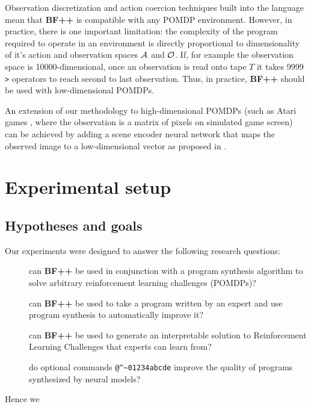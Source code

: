 Observation discretization and action coercion techniques built into the language mean that \textbf{BF++} is compatible with any POMDP environment. 
However, in practice, there is one important limitation: the complexity of the program required to operate in an environment is directly proportional to dimensionality of it's action and observation spaces $\mathcal{A}$ and $\mathcal{O}$. 
If, for example the observation space is 10000-dimensional, once an observation is read onto tape $T$ it takes 9999 \verb|>| operators to reach second to last observation.
Thus, in practice, \textbf{BF++} should be used with low-dimensional POMDPs.

An extension of our methodology to high-dimensional POMDPs (such as Atari games \cite{atari}, where the observation is a matrix of pixels on simulated game screen) can be achieved by adding a scene encoder neural network that maps the observed image to a low-dimensional vector as proposed in \cite{daqn}.

\newpage
\section{Experimental setup}
\label{sec:bfpp-experiments}

\subsection{Hypotheses and goals}
\label{sec:exgoals}

Our experiments were designed to answer the following research questions:

\begin{description}
    \item[\rqbfpp] can \textbf{BF++} be used in conjunction with a program synthesis algorithm to solve arbitrary reinforcement learning challenges (POMDPs)?
    \item[\rqbfppexpert] can \textbf{BF++} be used to take a program written by an expert and use program synthesis to automatically improve it?
    \item[\rqbfppexplainable] can \textbf{BF++} be used to generate an interpretable solution to Reinforcement Learning Challenges that experts can learn from?
    \item[\rqbfppablation] do optional commands \verb|@^~01234abcde| improve the quality of programs synthesized by neural models?
\end{description}

Hence we

